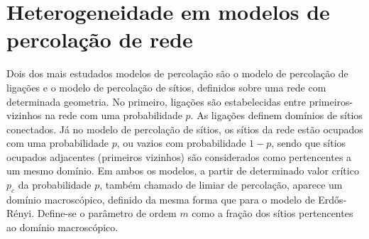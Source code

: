 \section{Heterogeneidade em modelos de percolação de rede}

Dois dos mais estudados modelos de percolação são o modelo de percolação de ligações e o modelo de percolação de sítios, definidos sobre uma rede com determinada geometria. No primeiro, ligações são estabelecidas entre primeiros-vizinhos na rede com uma probabilidade $p$. As ligações definem domínios de sítios conectados. Já no modelo de percolação de sítios, os sítios da rede estão ocupados com uma probabilidade $p$, ou vazios com probabilidade $1-p$, sendo que sítios ocupados adjacentes (primeiros vizinhos) são considerados como pertencentes a um mesmo domínio. Em ambos os modelos, a partir de determinado valor crítico $p_c$ da probabilidade $p$, também chamado de limiar de percolação, aparece um domínio macroscópico, definido da mesma forma que para o modelo de Erdős-Rényi. Define-se o parâmetro de ordem $m$ como a fração dos sítios pertencentes ao domínio macroscópico.

